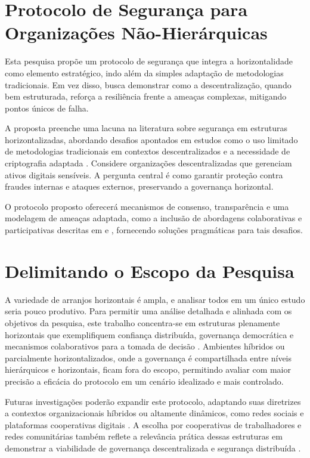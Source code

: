 \section{Protocolo de Segurança para Organizações Não-Hierárquicas}
\label{sec:objetivos_pesquisa}

Esta pesquisa propõe um protocolo de segurança que integra a
horizontalidade como elemento estratégico, indo além da simples adaptação
de metodologias tradicionais. Em vez disso, busca demonstrar como a
descentralização, quando bem estruturada, reforça a resiliência frente a
ameaças complexas, mitigando pontos únicos de falha.

A proposta preenche uma lacuna na literatura sobre segurança em estruturas
horizontalizadas, abordando desafios apontados em estudos como o uso
limitado de metodologias tradicionais em contextos descentralizados
\cite{ThreatModellingSurvey} e a necessidade de criptografia adaptada
\cite{Colbac}. Considere organizações descentralizadas que gerenciam ativos
digitais sensíveis. A pergunta central é como garantir proteção contra
fraudes internas e ataques externos, preservando a governança horizontal.

O protocolo proposto oferecerá mecanismos de consenso, transparência e uma
modelagem de ameaças adaptada, como a inclusão de abordagens colaborativas
e participativas descritas em \cite{Colbac} e \cite{AbcCrypto}, fornecendo
soluções pragmáticas para tais desafios.


\section{Delimitando o Escopo da Pesquisa}
\label{sec:delimitacao_escopo}

A variedade de arranjos horizontais é ampla, e analisar todos em um único
estudo seria pouco produtivo. Para permitir uma análise detalhada e
alinhada com os objetivos da pesquisa, este trabalho concentra-se em
estruturas plenamente horizontais que exemplifiquem confiança distribuída,
governança democrática e mecanismos colaborativos para a tomada de decisão
\cite{Colbac}. Ambientes híbridos ou parcialmente horizontalizados, onde a
governança é compartilhada entre níveis hierárquicos e horizontais, ficam
fora do escopo, permitindo avaliar com maior precisão a eficácia do
protocolo em um cenário idealizado e mais controlado.

Futuras investigações poderão expandir este protocolo, adaptando suas
diretrizes a contextos organizacionais híbridos ou altamente dinâmicos,
como redes sociais e plataformas cooperativas digitais
\cite{CreatingTheCollectiveSocialMedia, Non-HierarchicalForms}. A escolha
por cooperativas de trabalhadores e redes comunitárias também reflete a
relevância prática dessas estruturas em demonstrar a viabilidade de
governança descentralizada e segurança distribuída
\cite{WorkerCooperativesinAmerica, EverydayRevolutions}.


